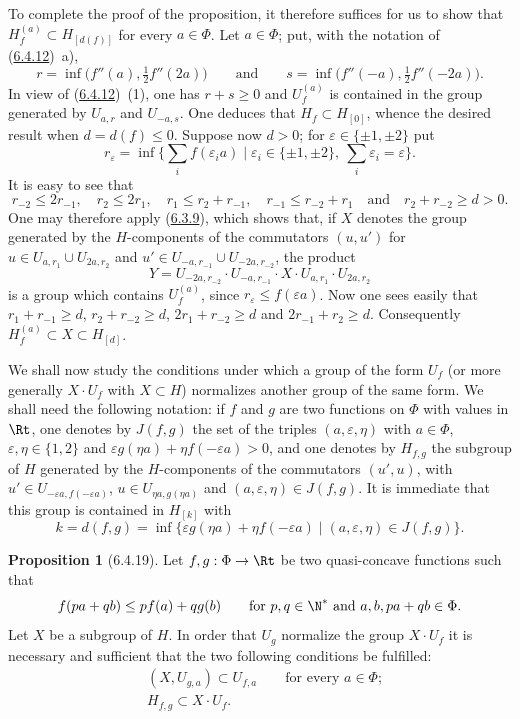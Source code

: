 \documentclass[12pt,a4paper,oneside,english]{smfart}
\makeatletter
\newcommand{\btanchor}[1]{\leavevmode\Hy@raisedlink{\hypertarget{bt:#1}{}}}
\newcommand{\btpageanchor}[1]{\Hy@raisedlink{\hypertarget{p:#1}{}}}
\newcommand{\btref}[1]{\hyperlink{bt:#1}{#1}}
\newcommand{\btpage}[1]{\marginnote{p.~#1}\btpageanchor{#1}}
\newcommand{\pmark}[1]{\btpage{#1}}
\theoremstyle{definition}
\theoremstyle{bt}
\newtheorem{prop}{Proposition}
\makeatother
\begin{document}
To complete the proof of the proposition, it therefore suffices for us to
show that $H_f^{(a)}\subset H_{[d(f)]}$ for every $a\in\Phi$. Let
$a\in\Phi$; put, with the notation of (\btref{6.4.12})~a),
\[
  r=\inf\big(f''(a),\tfrac12 f''(2a)\big)\qquad\text{and}\qquad   s=\inf\big(f''(-a),\tfrac12 f''(-2a)\big).
\]
In view of (\btref{6.4.12})~(1), one has $r+s\geq0$ and $U_f^{(a)}$ is contained in
the group generated by $U_{a,r}$ and $U_{-a,s}$. One deduces that
$H_f\subset H_{[0]}$, whence the desired result when $d=d(f)\leq0$. Suppose
now $d>0$; for $\varepsilon\in\{\pm1,\pm2\}$ put
\[
  r_{\varepsilon}=\inf\Big\{\sum_i f(\varepsilon_i a)\;\Big|\;
   \varepsilon_i\in\{\pm1,\pm2\},\ \sum_i\varepsilon_i=\varepsilon\Big\}.
\]
\pmark{141}
It is easy to see that
\[
  r_{-2}\leq2r_{-1},\quad r_2\leq2r_1,\quad r_1\leq r_2+r_{-1},\quad   r_{-1}\leq r_{-2}+r_1\quad\text{and}\quad r_2+r_{-2}\geq d>0.
\]
One may therefore apply (\btref{6.3.9}), which shows that, if $X$ denotes the group
generated by the $H$-components of the commutators $(u,u')$ for
$u\in U_{a,r_1}\cup U_{2a,r_2}$ and
$u'\in U_{-a,r_{-1}}\cup U_{-2a,r_{-2}}$, the product
\[
  Y=U_{-2a,r_{-2}}\cdot U_{-a,r_{-1}}\cdot X\cdot U_{a,r_1}\cdot U_{2a,r_2}
\]
is a group which contains $U_f^{(a)}$, since
$r_{\varepsilon}\leq f(\varepsilon a)$. Now one sees easily that
$r_1+r_{-1}\geq d$, $r_2+r_{-2}\geq d$, $2r_1+r_{-2}\geq d$ and
$2r_{-1}+r_2\geq d$. Consequently $H_f^{(a)}\subset X\subset H_{[d]}$.

\btanchor{6.4.18}
We shall now study the conditions under which a group of the form $U_f$ (or
more generally $X\cdot U_f$ with $X\subset H$) normalizes another group of
the same form. We shall need the following notation: if $f$ and $g$ are two
functions on $\Phi$ with values in $\Rt$, one denotes by $J(f,g)$ the set of
the triples $(a,\varepsilon,\eta)$ with $a\in\Phi$,
$\varepsilon,\eta\in\{1,2\}$ and
$\varepsilon g(\eta a)+\eta f(-\varepsilon a)>0$, and one denotes by
$H_{f,g}$ the subgroup of $H$ generated by the $H$-components of the
commutators $(u',u)$, with $u'\in U_{-\varepsilon a,f(-\varepsilon a)}$,
$u\in U_{\eta a,g(\eta a)}$ and $(a,\varepsilon,\eta)\in J(f,g)$. It is
immediate that this group is contained in $H_{[k]}$ with
\[
  k=d(f,g)=\inf\{\varepsilon g(\eta a)+\eta f(-\varepsilon a)\mid    (a,\varepsilon,\eta)\in J(f,g)\}.
\]

\begin{prop}[6.4.19]\btanchor{6.4.19}
Let $f,g:\Phi\to\Rt$ be two quasi-concave functions such that
\begin{equation}
  f(pa+qb)\leq pf(a)+qg(b)\qquad\text{for }p,q\in\N^{*}
  \text{ and }a,b,pa+qb\in\Phi.
\end{equation}
Let $X$ be a subgroup of $H$. In order that $U_g$ normalize the group
$X\cdot U_f$ it is necessary and sufficient that the two following
conditions be fulfilled:
\begin{align}
  &(X,U_{g,a})\subset U_{f,a}\qquad\text{for every }a\in\Phi;\\
  &H_{f,g}\subset X\cdot U_f .
\end{align}
\end{prop}
\end{document}
